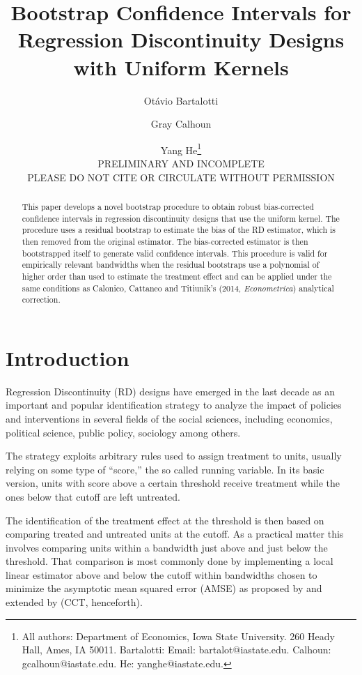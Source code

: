 \documentclass[12pt,fleqn]{article}
\title{Bootstrap Confidence Intervals for Regression Discontinuity Designs with Uniform Kernels}
\author{Ot\'avio Bartalotti \and Gray Calhoun \and Yang He\thanks{All authors: 
Department of Economics, Iowa State University. 260 Heady Hall, Ames, IA  50011.
Bartalotti: Email: bartalot@iastate.edu. Calhoun: gcalhoun@iastate.edu.
He: yanghe@iastate.edu.} \\ PRELIMINARY AND INCOMPLETE \\PLEASE DO NOT CITE OR CIRCULATE WITHOUT PERMISSION}
\begin{document}
\maketitle

\begin{abstract}\noindent
  This paper develops a novel bootstrap procedure to obtain robust
  bias-corrected confidence intervals in regression discontinuity designs that
  use the uniform kernel. The procedure uses a residual bootstrap to estimate
  the bias of the RD estimator, which is then removed from the original estimator.
 The bias-corrected estimator is then bootstrapped itself to
  generate valid confidence intervals. This procedure is valid for empirically
  relevant bandwidths when the residual bootstraps use a polynomial of higher
  order than used to estimate the treatment effect and can be applied under the
  same conditions as Calonico, Cattaneo and Titiunik's (2014,
  \textit{Econometrica}) analytical correction.
\end{abstract}

\section{Introduction}
Regression Discontinuity (RD) designs have emerged in the last decade as an 
important and popular identification strategy to analyze the impact of policies
and interventions in several fields of the social sciences, including economics,
political science, public policy, sociology among others.

The strategy exploits arbitrary rules used to assign treatment to units, usually
relying on some type of ``score,'' the so called running variable. In its basic 
version, units with score above a certain threshold receive treatment while the 
ones below that cutoff are left untreated.

The identification of the treatment effect at the threshold is then based on 
comparing treated and untreated units at the cutoff. As a practical matter this 
involves comparing units within a bandwidth just above and just below the 
threshold. That comparison is most commonly done by implementing a local linear
estimator above and below the cutoff within bandwidths chosen to minimize the 
asymptotic mean squared error (AMSE) as proposed by \cite{IK}
and extended by \cite{calonico2014} (CCT, henceforth).
\end{document}
